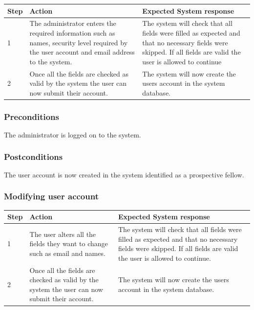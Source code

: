 \documentclass[12pt]{article}
\begin{document}
\begin{center}
\begin{tabular}{|l|p{6cm}|p{8cm}|}
\hline
Step & Action & Expected System response \\
\hline
1 & The administrator enters the required information such as names, security level required by the user account and email address to the system.  & The system will check that all fields were filled as expected and that no necessary fields were skipped. If all fields are valid the user is allowed to continue \\
\hline
2 & Once all the fields are checked as valid by the system the user can now submit their account. & The system will now create the users account in the system database. \\
\hline
\end{tabular}
\end{center}

\subsubsection*{Preconditions}
The administrator is logged on to the system.

\subsubsection*{Postconditions}
The user account is now created in the system identified as a prospective fellow.

\subsubsection{Modifying user account}

\begin{center}
\begin{tabular}{|l|p{6cm}|p{8cm}|}
\hline
Step & Action & Expected System response \\
\hline
1 & The user alters all the fields they want to change such as email and names. & The system will check that all fields were filled as expected and that no necessary fields were skipped. If all fields are valid the user is allowed to continue. \\
\hline
2 & Once all the fields are checked as valid by the system the user can now submit their account. & The system will now create the users account in the system database. \\
\hline
\end{tabular}
\end{center}
\end{document}
